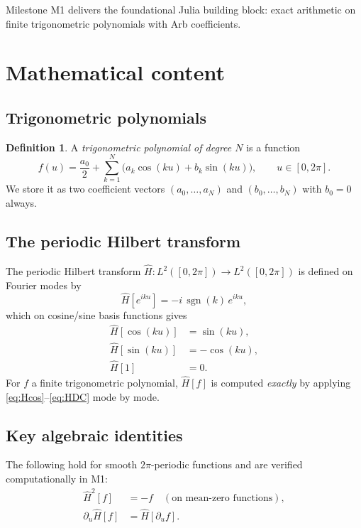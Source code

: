 \documentclass[11pt]{article}
\theoremstyle{definition}
\newtheorem{definition}{Definition}
\begin{document}
Milestone M1 delivers the foundational Julia building block: exact arithmetic on
finite trigonometric polynomials with Arb coefficients.

\section{Mathematical content}

\subsection{Trigonometric polynomials}

\begin{definition}
A \emph{trigonometric polynomial of degree $N$} is a function
\[
  f(u) = \frac{a_0}{2} + \sum_{k=1}^N \bigl(a_k \cos(ku) + b_k \sin(ku)\bigr),
  \qquad u \in [0, 2\pi].
\]
We store it as two coefficient vectors $(a_0,\ldots,a_N)$ and $(b_0,\ldots,b_N)$
with $b_0 = 0$ always.
\end{definition}

\subsection{The periodic Hilbert transform}

The periodic Hilbert transform $\hat H : L^2([0,2\pi]) \to L^2([0,2\pi])$
is defined on Fourier modes by
\[
  \hat H[e^{iku}] = -i\,\operatorname{sgn}(k)\,e^{iku},
\]
which on cosine/sine basis functions gives
\begin{align}
  \hat H[\cos(ku)] &= \sin(ku), \label{eq:Hcos}\\
  \hat H[\sin(ku)] &= -\cos(ku), \label{eq:Hsin}\\
  \hat H[1] &= 0. \label{eq:HDC}
\end{align}
For $f$ a finite trigonometric polynomial, $\hat H[f]$ is computed
\emph{exactly} by applying \eqref{eq:Hcos}--\eqref{eq:HDC} mode by mode.

\subsection{Key algebraic identities}

The following hold for smooth $2\pi$-periodic functions and are verified
computationally in M1:
\begin{align}
  \hat H^2[f] &= -f \quad (\text{on mean-zero functions}), \label{eq:Hsq}\\
  \partial_u \hat H[f] &= \hat H[\partial_u f]. \label{eq:commute}
\end{align}
\end{document}
